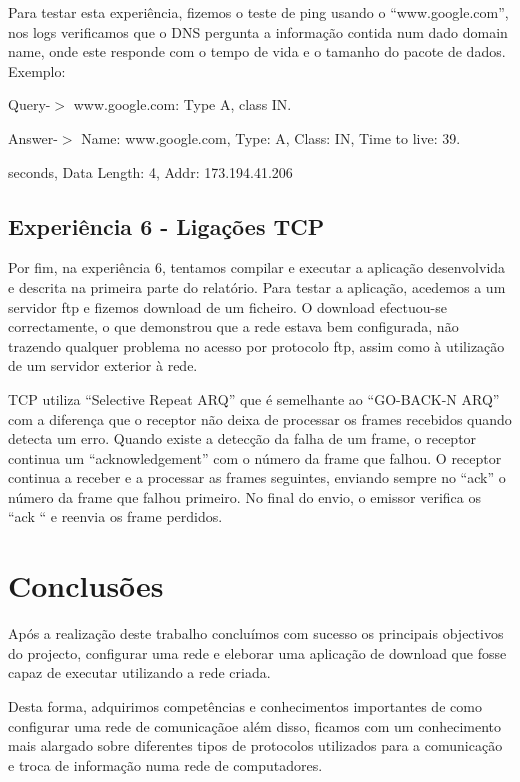 \documentclass[a4paper]{article}
\begin{document}

Para testar esta experiência, fizemos o teste de ping usando o “www.google.com”, nos logs verificamos que o DNS pergunta a informação contida num dado domain name, onde este responde com o tempo de vida e o tamanho do pacote de dados.\linebreak
Exemplo:

Query-$>$ www.google.com: Type A, class IN.

Answer-$>$ Name: www.google.com, Type: A, Class: IN, Time to live: 39.

seconds, Data Length: 4, Addr: 173.194.41.206

\subsection{Experiência 6 - Ligações TCP}
Por fim, na experiência 6, tentamos compilar e executar a aplicação desenvolvida e descrita na primeira parte do relatório.
	Para testar a aplicação, acedemos a um servidor ftp e fizemos download de um ficheiro. O download efectuou-se correctamente, o que demonstrou que a rede estava bem configurada, não trazendo qualquer problema no acesso por protocolo ftp, assim como à utilização de um servidor exterior à rede.

	TCP utiliza “Selective Repeat ARQ” que é semelhante ao “GO-BACK-N ARQ” com a diferença que o receptor não deixa de processar os frames recebidos quando detecta um erro. Quando existe a detecção da falha de um frame, o receptor continua um “acknowledgement” com o número da frame que falhou. O receptor continua a receber e a processar as frames seguintes, enviando sempre no “ack” o número da frame que falhou primeiro. No final do envio, o emissor verifica os “ack “ e reenvia os frame perdidos.

\section{Conclusões}
Após a realização deste trabalho concluímos com sucesso os principais objectivos do projecto, configurar uma rede e eleborar uma aplicação de download que fosse capaz de executar utilizando a rede criada. 

Desta forma, adquirimos competências e conhecimentos importantes de como configurar uma rede de comunicaçãoe além disso, ficamos com um conhecimento mais alargado sobre diferentes tipos de protocolos utilizados para a comunicação e troca de informação numa rede de computadores.
 
\end{document}

